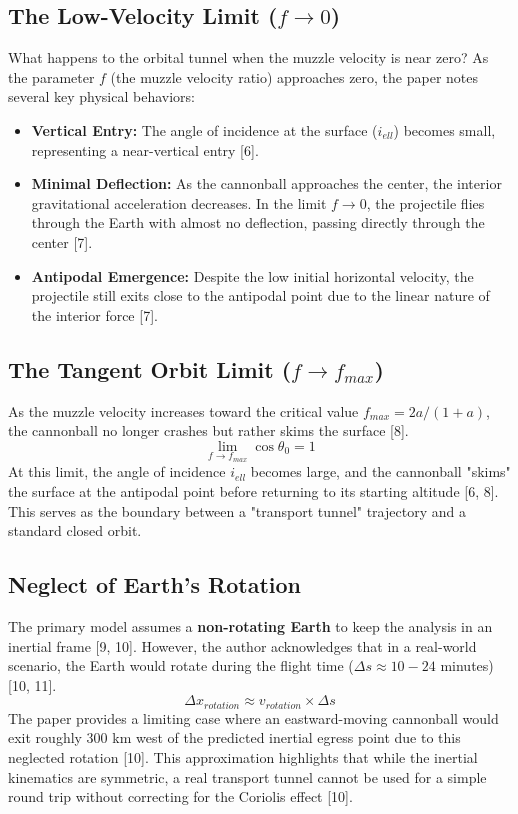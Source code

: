 \documentclass[11pt,letterpaper]{article}
\begin{document}
\subsection{The Low-Velocity Limit ($f \to 0$)}
What happens to the orbital tunnel when the muzzle velocity is near zero? As the parameter $f$ (the muzzle velocity ratio) approaches zero, the paper notes several key physical behaviors:
\begin{itemize}
    \item \textbf{Vertical Entry:} The angle of incidence at the surface ($i_{ell}$) becomes small, representing a near-vertical entry [6].
    \item \textbf{Minimal Deflection:} As the cannonball approaches the center, the interior gravitational acceleration decreases. In the limit $f \to 0$, the projectile flies through the Earth with almost no deflection, passing directly through the center [7].
    \item \textbf{Antipodal Emergence:} Despite the low initial horizontal velocity, the projectile still exits close to the antipodal point due to the linear nature of the interior force [7].
\end{itemize}

\subsection{The Tangent Orbit Limit ($f \to f_{max}$)}
As the muzzle velocity increases toward the critical value $f_{max} = 2a / (1 + a)$, the cannonball no longer crashes but rather skims the surface [8]. 
\begin{equation}
    \lim_{f \to f_{max}} \cos \theta_0 = 1
\end{equation}
At this limit, the angle of incidence $i_{ell}$ becomes large, and the cannonball "skims" the surface at the antipodal point before returning to its starting altitude [6, 8]. This serves as the boundary between a "transport tunnel" trajectory and a standard closed orbit.

\subsection{Neglect of Earth's Rotation}
The primary model assumes a \textbf{non-rotating Earth} to keep the analysis in an inertial frame [9, 10]. However, the author acknowledges that in a real-world scenario, the Earth would rotate during the flight time ($\Delta s \approx 10-24$ minutes) [10, 11]. 
\begin{equation}
    \Delta x_{rotation} \approx v_{rotation} \times \Delta s
\end{equation}
The paper provides a limiting case where an eastward-moving cannonball would exit roughly 300 km west of the predicted inertial egress point due to this neglected rotation [10]. This approximation highlights that while the inertial kinematics are symmetric, a real transport tunnel cannot be used for a simple round trip without correcting for the Coriolis effect [10].
\end{document}
